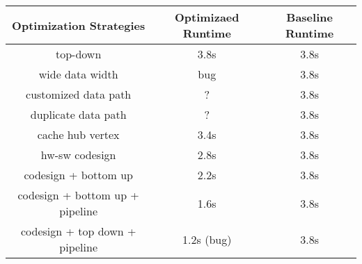 \documentclass[12pt]{article} %
\begin{document}
\begin{center}
    \begin{tabular}{c|c|c}
        Optimization Strategies & Optimizaed Runtime & Baseline Runtime \\ \hline
        top-down & 3.8s & 3.8s \\ \hline 
        wide data width & bug & 3.8s \\ \hline
        customized data path & ? & 3.8s \\ \hline
        duplicate data path & ? & 3.8s \\ \hline
        cache hub vertex & 3.4s & 3.8s \\ \hline
        hw-sw codesign & 2.8s & 3.8s \\ \hline
        codesign + bottom up & 2.2s & 3.8s \\ \hline
        codesign + bottom up + pipeline & 1.6s & 3.8s \\ \hline
        codesign + top down + pipeline & 1.2s (bug) & 3.8s \\ 
    \end{tabular}
\end{center}







\end{document}
